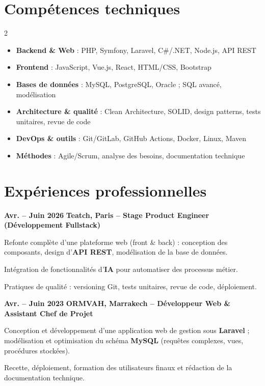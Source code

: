 \documentclass[10pt,a4paper]{article}
\newenvironment{resume_list}{\vspace{-2pt}\begin{itemize}[itemsep=0.3pt,parsep=0pt,topsep=0.3pt,leftmargin=18pt]}{\end{itemize}\vspace{-2pt}}
\newcommand{\heading}[2]{{\raggedright\noindent\textbf{#2} \quad \textbf{#1}\\}}
\begin{document}
\section{Compétences techniques}
\begin{multicols}{2}
\begin{itemize}[itemsep=0.3pt,leftmargin=18pt]
  \item \textbf{Backend \& Web} : PHP, Symfony, Laravel, C\#/.NET, Node.js, API REST
  \item \textbf{Frontend} : JavaScript, Vue.js, React, HTML/CSS, Bootstrap
  \item \textbf{Bases de données} : MySQL, PostgreSQL, Oracle ; SQL avancé, modélisation
  \item \textbf{Architecture \& qualité} : Clean Architecture, SOLID, design patterns, tests unitaires, revue de code
  \item \textbf{DevOps \& outils} : Git/GitLab, GitHub Actions, Docker, Linux, Maven
  \item \textbf{Méthodes} : Agile/Scrum, analyse des besoins, documentation technique
\end{itemize}
\end{multicols}

\section{Expériences professionnelles}

\heading{Teatch, Paris \textbf{--} Stage Product Engineer (Développement Fullstack)}{Avr. -- Juin 2026}
\begin{resume_list}
  \item Refonte complète d'une plateforme web (front \& back) : conception des composants, design d'\textbf{API REST}, modélisation de la base de données.
  \item Intégration de fonctionnalités d'\textbf{IA} pour automatiser des processus métier.
  \item Pratiques de qualité : versioning Git, tests unitaires, revue de code, déploiement.
\end{resume_list}

\heading{ORMVAH, Marrakech \textbf{--} Développeur Web \& Assistant Chef de Projet}{Avr. -- Juin 2023}
\begin{resume_list}
  \item Conception et développement d'une application web de gestion sous \textbf{Laravel} ; modélisation et optimisation du schéma \textbf{MySQL} (requêtes complexes, vues, procédures stockées).
  \item Recette, déploiement, formation des utilisateurs finaux et rédaction de la documentation technique.
\end{resume_list}
\end{document}
